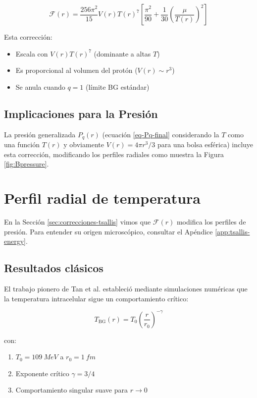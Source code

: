 \begin{equation} \label{eq:F-tsallis}
\mathcal{F}(r) = \frac{256\pi^2}{15}V(r)T(r)^7\left[\frac{\pi^2}{90} + \frac{1}{30}\left(\frac{\mu}{T(r)}\right)^2\right]
\end{equation}

\begin{physicalinsight}
Esta corrección:
\begin{itemize}
    \item Escala con $V(r)T(r)^7$ (dominante a altas $T$)
    \item Es proporcional al volumen del protón ($V(r) \sim r^3$)
    \item Se anula cuando $q=1$ (límite BG estándar)
\end{itemize}
\end{physicalinsight}

\subsection{Implicaciones para la Presión}
La presión generalizada $P_q(r)$ (ecuación \eqref{eq-Pq-final} considerando la $T$ como una función $T(r)$ y obviamente $V (r)= 4 \pi {r}^{3} / 3$ para una bolsa esférica) incluye esta corrección, modificando los perfiles radiales como muestra la Figura \ref{fig:Bpressure}.

\section{Perfil radial de temperatura}
En la Sección \ref{sec:correcciones-tsallis} vimos que $\mathcal{F}(r)$ modifica los perfiles de presión. Para entender su origen microscópico, consultar el Apéndice \ref{app:tsallis-energy}.

\subsection{Resultados clásicos}
El trabajo pionero de Tan et al. \cite{tan2019} estableció mediante simulaciones numéricas que la temperatura intracelular sigue un comportamiento crítico:

\begin{equation} \label{eq-Tclassic}
T_{\text{BG}}(r) = T_0\left(\frac{r}{r_0}\right)^{-\gamma}
\end{equation}

con:

\begin{enumerate}[ a. ]
    \item $T_0 = \qty{109}{MeV}$ a $r_0 = \qty{1}{fm}$
    \item Exponente crítico $\gamma = 3/4$
    \item Comportamiento singular suave para $r \to 0$
\end{enumerate}

